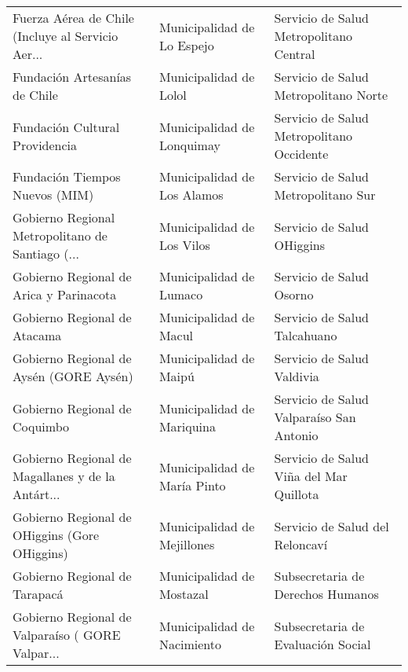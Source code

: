 \documentclass[11pt]{article}
\begin{document}
\begin{longtable}{ p{5cm} | p{5cm} | p{5cm} }
 Fuerza Aérea de Chile (Incluye al Servicio Aer... &                         Municipalidad de Lo Espejo &            Servicio de Salud Metropolitano Central \\
                     Fundación Artesanías de Chile &                             Municipalidad de Lolol &              Servicio de Salud Metropolitano Norte \\
                    Fundación Cultural Providencia &                         Municipalidad de Lonquimay &          Servicio de Salud Metropolitano Occidente \\
                    Fundación Tiempos Nuevos (MIM) &                        Municipalidad de Los Alamos &                Servicio de Salud Metropolitano Sur \\
 Gobierno Regional Metropolitano de Santiago  (... &                         Municipalidad de Los Vilos &                         Servicio de Salud OHiggins \\
           Gobierno Regional de Arica y Parinacota &                            Municipalidad de Lumaco &                           Servicio de Salud Osorno \\
                      Gobierno Regional de Atacama &                             Municipalidad de Macul &                       Servicio de Salud Talcahuano \\
           Gobierno Regional de Aysén (GORE Aysén) &                             Municipalidad de Maipú &                         Servicio de Salud Valdivia \\
                     Gobierno Regional de Coquimbo &                         Municipalidad de Mariquina &          Servicio de Salud Valparaíso  San Antonio \\
 Gobierno Regional de Magallanes y de la Antárt... &                       Municipalidad de María Pinto &           Servicio de Salud Viña del Mar  Quillota \\
     Gobierno Regional de OHiggins (Gore OHiggins) &                        Municipalidad de Mejillones &                    Servicio de Salud del Reloncaví \\
                     Gobierno Regional de Tarapacá &                          Municipalidad de Mostazal &                  Subsecretaria de Derechos Humanos \\
 Gobierno Regional de Valparaíso  ( GORE Valpar... &                        Municipalidad de Nacimiento &                 Subsecretaria de Evaluación Social \\

\end{longtable}
\end{document}
